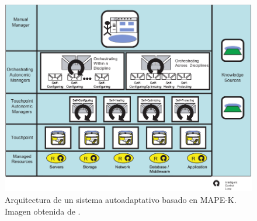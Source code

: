 \begin{figure}[htb]
  \centering
  \includegraphics[scale=0.5]{cap_contexto_tecnologico/images/mape-k-architecture}
  \caption[Arquitectura de un sistema autoadaptativo basado en MAPE-K.]{Arquitectura de un sistema autoadaptativo basado en MAPE-K. Imagen obtenida de \cite{ibmcorporationArchitecturalBlueprintAutonomic2006}.}
  \label{fig:autonomic-system}
\end{figure}
